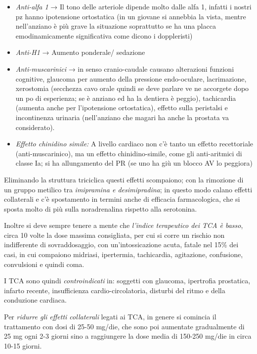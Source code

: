 \documentclass[]{article}
\begin{document}
\begin{itemize}
\item
  \emph{Anti-alfa 1} → Il tono delle arteriole dipende molto dalle alfa
  1, infatti i nostri pz hanno ipotensione ortostatica (in un giovane si
  annebbia la vista, mentre nell'anziano è più grave la situazione
  soprattutto se ha una placca emodinamicamente significativa come
  dicono i doppleristi)
\item
  \emph{Anti-H1} → Aumento ponderale/ sedazione
\item
  \emph{Anti-muscarinici} → in senso cranio-caudale causano alterazioni
  funzioni cognitive, glaucoma per aumento della pressione endo-oculare,
  lacrimazione, xerostomia (secchezza cavo orale quindi se deve parlare
  ve ne accorgete dopo un po di esperienza; se è anziano ed ha la
  dentiera è peggio), tachicardia (aumenta anche per l'ipotensione
  ortostatica), effetto sulla peristalsi e incontinenza urinaria
  (nell'anziano che magari ha anche la prostata va considerato).
\item
  \emph{Effetto chinidino simile:} A livello cardiaco non c'è tanto un
  effetto recettoriale (anti-muscarinico), ma un effetto
  chinidino-simile, come gli anti-aritmici di classe Ia; si ha
  allungamento del PR (se uno ha giù un blocco AV lo peggiora)
\end{itemize}

Eliminando la struttura triciclica questi effetti scompaiono; con la
rimozione di un gruppo metilico tra \emph{imipramina e desimipradina};
in questo modo calano effetti collaterali e c'è spostamento in termini
anche di efficacia farmacologica, che si sposta molto di più sulla
noradrenalina rispetto alla serotonina.

Inoltre si deve sempre tenere a mente che \emph{l'indice terapeutico dei
TCA è basso}, circa 10 volte la dose massima consigliata, per cui si
corre un rischio non indifferente di sovraddosaggio, con
un'intossicazione acuta, fatale nel 15\% dei casi, in cui compaiono
midriasi, ipertermia, tachicardia, agitazione, confusione, convulsioni e
quindi coma.

I TCA sono quindi \emph{controindicati} in: soggetti con glaucoma,
ipertrofia prostatica, infarto recente, insufficienza
cardio-circolatoria, disturbi del ritmo e della conduzione cardiaca.

Per \emph{ridurre gli effetti collaterali} legati ai TCA, in genere si
comincia il trattamento con dosi di 25-50 mg/die, che sono poi aumentate
gradualmente di 25 mg ogni 2-3 giorni sino a raggiungere la dose media
di 150-250 mg/die in circa 10-15 giorni.
\end{document}
